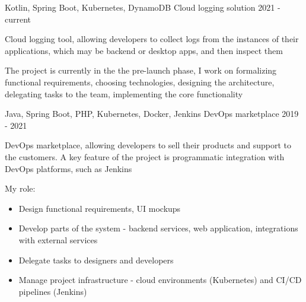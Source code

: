 

\begin{cventries}

    \cventry
    {Kotlin, Spring Boot, Kubernetes, DynamoDB}
    {Cloud logging solution}
    {}
    {2021 - current}
    {
        \begin{cvitems} %
            \item Cloud logging tool, allowing developers to collect logs from the instances of their applications, which may be backend or desktop apps, and then inspect them
            \item The project is currently in the the pre-launch phase, I work on formalizing functional requirements, choosing technologies, designing the architecture, delegating tasks to the team, implementing the core functionality
        \end{cvitems}
    }

    \cventry
    {Java, Spring Boot, PHP, Kubernetes, Docker, Jenkins}
    {DevOps marketplace}
    {}
    {2019 - 2021}
    {
        \begin{cvitems} %
            \item DevOps marketplace, allowing developers to sell their products and support to the customers. A key feature of the project is programmatic integration with DevOps platforms, such as Jenkins
            \item My role:
            \begin{itemize}[label={•},leftmargin=10pt]
                \item Design functional requirements, UI mockups
                \item Develop parts of the system - backend services, web application, integrations with external services
                \item Delegate tasks to designers and developers
                \item Manage project infrastructure - cloud environments (Kubernetes) and CI/CD pipelines (Jenkins)
            \end{itemize}
        \end{cvitems}
    }


\end{cventries}
